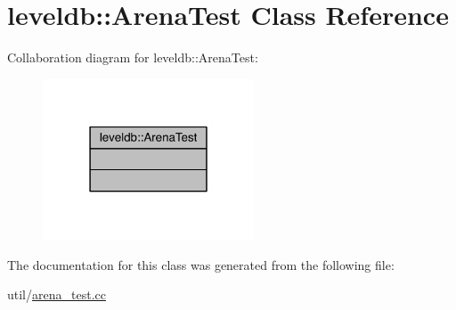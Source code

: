 \hypertarget{classleveldb_1_1_arena_test}{}\section{leveldb\+:\+:Arena\+Test Class Reference}
\label{classleveldb_1_1_arena_test}


Collaboration diagram for leveldb\+:\+:Arena\+Test\+:\nopagebreak
\begin{figure}[H]
\begin{center}
\leavevmode
\includegraphics[width=178pt]{classleveldb_1_1_arena_test__coll__graph}
\end{center}
\end{figure}


The documentation for this class was generated from the following file\+:\begin{DoxyCompactItemize}
\item 
util/\hyperlink{arena__test_8cc}{arena\+\_\+test.\+cc}\end{DoxyCompactItemize}
